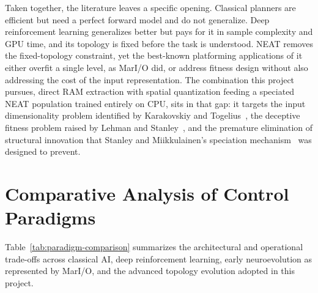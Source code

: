 Taken together, the literature leaves a specific opening. Classical planners
are efficient but need a perfect forward model and do not generalize. Deep
reinforcement learning generalizes better but pays for it in sample complexity
and GPU time, and its topology is fixed before the task is understood. NEAT
removes the fixed-topology constraint, yet the best-known platforming
applications of it either overfit a single level, as MarI/O did, or address
fitness design without also addressing the cost of the input representation.
The combination this project pursues, direct RAM extraction with spatial
quantization feeding a speciated NEAT population trained entirely on CPU, sits
in that gap: it targets the input dimensionality problem identified by
Karakovskiy and Togelius~\cite{karakovskiy2012}, the deceptive fitness problem
raised by Lehman and Stanley~\cite{lehman2011}, and the premature elimination of structural innovation that Stanley
and Miikkulainen's speciation mechanism~\cite{stanley2002} was designed to
prevent.

\section{Comparative Analysis of Control Paradigms}
\label{sec:comparative-analysis}

Table~\ref{tab:paradigm-comparison} summarizes the architectural and
operational trade-offs across classical AI, deep reinforcement learning, early
neuroevolution as represented by MarI/O, and the advanced topology evolution
adopted in this project.

